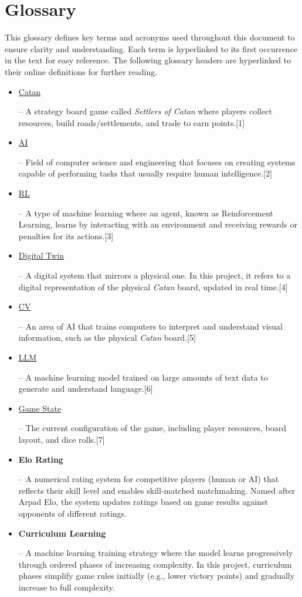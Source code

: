 \documentclass{article}
\newcommand{\CatanExt}{\href{https://en.wikipedia.org/wiki/Catan}{Catan}}
\newcommand{\AIExt}{\href{https://en.wikipedia.org/wiki/Artificial_intelligence}{AI}}
\newcommand{\RLExt}{\href{https://www.ibm.com/think/topics/reinforcement-learning}{RL}}
\newcommand{\DigitalTwinExt}{\href{https://en.wikipedia.org/wiki/Digital_twin}{Digital Twin}}
\newcommand{\CVExt}{\href{https://www.ibm.com/think/topics/computer-vision}{CV}}
\newcommand{\LLMExt}{\href{https://www.cloudflare.com/learning/ai/what-is-large-language-model/}{LLM}}
\newcommand{\GameStateExt}{\href{https://milvus.io/ai-quick-reference/what-is-a-state-in-rl}{Game State}}
\begin{document}
\section*{Glossary}
\raggedright This glossary defines key terms and acronyms used throughout this document to ensure clarity and understanding. Each term is hyperlinked to its first occurrence in the text for easy reference.
The following glossary headers are hyperlinked to their online definitions for further reading.
\begin{itemize}
    \item \hypertarget{glossary-catan}{\CatanExt{}} – A strategy board game called \textit{Settlers of Catan} where players collect resources, build roads/settlements, and trade to earn points.[1]
    \item \hypertarget{glossary-ai}{\AIExt{}} – Field of computer science and engineering that focuses on creating systems capable of performing tasks that usually require human intelligence.[2]
    \item \hypertarget{glossary-rl}{\RLExt{}} – A type of machine learning where an agent, known as Reinforcement Learning, learns by interacting with an environment and receiving rewards or penalties for its actions.[3]
    \item \hypertarget{glossary-dt}{\DigitalTwinExt{}} – A digital system that mirrors a physical one. In this project, it refers to a digital representation of the physical \emph{Catan} board, updated in real time.[4]
    \item \hypertarget{glossary-cv}{\CVExt{}} – An area of AI that trains computers to interpret and understand visual information, such as the physical \emph{Catan} board.[5]
    \item \hypertarget{glossary-llm}{\LLMExt{}} – A machine learning model trained on large amounts of text data to generate and understand language.[6]
    \item \hypertarget{glossary-gamestate}{\GameStateExt{}} – The current configuration of the game, including player resources, board layout, and dice rolls.[7]
    \item \hypertarget{glossary-elo}{\textbf{Elo Rating}} – A numerical rating system for competitive players (human or AI) that reflects their skill level and enables skill-matched matchmaking. Named after Arpad Elo, the system updates ratings based on game results against opponents of different ratings.
    \item \hypertarget{glossary-curriculum}{\textbf{Curriculum Learning}} – A machine learning training strategy where the model learns progressively through ordered phases of increasing complexity. In this project, curriculum phases simplify game rules initially (e.g., lower victory points) and gradually increase to full complexity.

\end{itemize}
\end{document}
